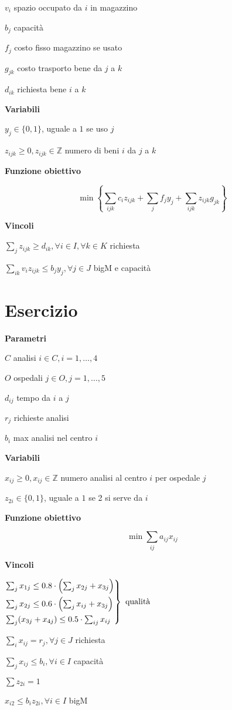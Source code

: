 \documentclass[10pt,a4paper,twoside,openright]{book}
\newcounter{es}
\newcommand{\Es}{
	\stepcounter{es}
	\section{Esercizio \arabic{es}}
	}
\newcommand{\Par}{\textbf{Parametri}}
\newcommand{\Var}{\textbf{Variabili}}
\newcommand{\Fob}{\textbf{Funzione obiettivo}}
\newcommand{\Vin}{\textbf{Vincoli}}
\begin{document}
$v_{i}$ spazio occupato da $i$ in magazzino

$b_{j}$ capacità

$f_{j}$ costo fisso magazzino se usato

$g_{jk}$ costo trasporto bene da $j$ a $k$

$d_{ik}$ richiesta bene $i$ a $k$

\Var

$y_{j} \in \{0,1\}$, uguale a $1$ se uso $j$

$z_{ijk} \geqslant 0,z_{ijk} \in \mathbb{Z}$ numero di beni $i$ da $j$ a $k$

\Fob

\begin{equation*}
	\min\left\{\sum _{ijk} c_{i} z_{ijk} +\sum _{j} f_{j} y_{j} +\sum _{ijk} z_{ijk} g_{jk}\right\}
\end{equation*}

\Vin

$\sum _{j} z_{ijk} \geqslant d_{ik} ,\forall i\in I,\forall k\in K$ richiesta

$\sum _{ik} v_{i} z_{ijk} \leq b_{j} y_{j} ,\forall j\in J$ bigM e capacità

\Es

\Par

$C$ analisi $i\in C,i=1,\dotsc ,4$

$O$ ospedali $j\in O,j=1,\dotsc ,5$

$d_{ij}$ tempo da $i$ a $j$

$r_{j}$ richieste analisi

$b_{i}$ max analisi nel centro $i$

\Var

$x_{ij} \geqslant 0,x_{ij} \in \mathbb{Z}$ numero analisi al centro $i$ per ospedale $j$

$z_{2i} \in \{0,1\}$, uguale a $1$ se 2 si serve da $i$

\Fob

\begin{equation*}
	\min\sum _{ij} a_{ij} x_{ij}
\end{equation*}

\Vin

${\textstyle \begin{drcases}
	{\textstyle \sum\nolimits _{j} x_{1j} \leq 0.8\cdot \left(\sum\nolimits _{j} x_{2j} +x_{3j}\right)}\\
	{\textstyle \sum _{j} x_{2j} \leq 0.6\cdot \left(\sum _{j} x_{ij} +x_{3j}\right)}\\
	{\textstyle \sum _{j}( x_{3j} +x_{4j}) \leq 0.5\cdot \sum _{ij} x_{ij}}
	\end{drcases} \ \text{qualità}}$

$\sum _{i} x_{ij} =r_{j} ,\forall j\in J$ richiesta

$\sum _{j} x_{ij} \leq b_{i} ,\forall i\in I$ capacità

$\sum z_{2i} =1$

$x_{i2} \leq b_{i} z_{2i} ,\forall i\in I$ bigM
\end{document}
